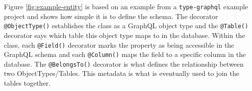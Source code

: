 Figure \ref{fig:example-entity} is based on an example from a \Verb!type-graphql! example project and shows how simple it is to define the schema.  The decorator \Verb!@ObjectType()! establishes the class as a GraphQL object type and the \Verb!@Table()! decorator says which table this object type maps to in the database.  Within the class, each \Verb!@Field()! decorator marks the property as being accessible in the GraphQL schema and each \Verb!@Column()! maps the field to a specific column in the database.  The \Verb!@BelongsTo()! decorator is what defines the relationship between two ObjectTypes/Tables.  This metadata is what is eventually used to join the tables together.